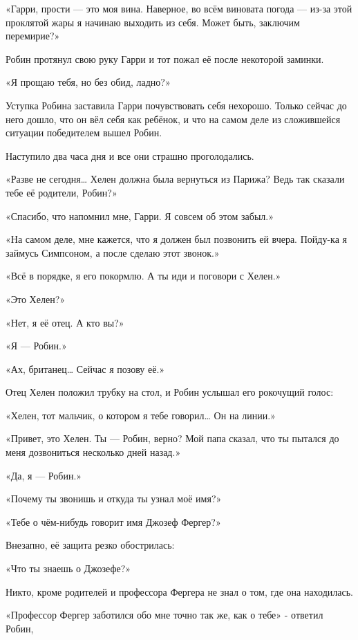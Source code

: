 \documentclass[a4paper,12pt]{book}
\begin{document}
\par
«Гарри, прости — это моя вина. Наверное, во всём виновата погода — из-за этой проклятой жары я начинаю выходить из себя. Может быть, заключим перемирие?»
\par
Робин протянул свою руку Гарри и тот пожал её после некоторой заминки.
\par
«Я прощаю тебя, но без обид, ладно?»
\par
Уступка Робина заставила Гарри почувствовать себя нехорошо. Только сейчас до него дошло, что он вёл себя как ребёнок, и что на самом деле из сложившейся ситуации победителем вышел Робин.
\par
Наступило два часа дня и все они страшно проголодались.
\par
«Разве не сегодня… Хелен должна была вернуться из Парижа? Ведь так сказали тебе её родители, Робин?»
\par
«Спасибо, что напомнил мне, Гарри. Я совсем об этом забыл.»
\par
«На самом деле, мне кажется, что я должен был позвонить ей вчера. Пойду-ка я займусь Симпсоном, а после сделаю этот звонок.»
\par
«Всё в порядке, я его покормлю. А ты иди и поговори с Хелен.»\\
\par
«Это Хелен?»
\par
«Нет, я её отец. А кто вы?»
\par
«Я — Робин.»
\par
«Ах, британец… Сейчас я позову её.»
\par
Отец Хелен положил трубку на стол, и Робин услышал его рокочущий голос:
\par
«Хелен, тот мальчик, о котором я тебе говорил… Он на линии.»\\
\par
«Привет, это Хелен. Ты — Робин, верно? Мой папа сказал, что ты пытался до меня дозвониться несколько дней назад.»
\par
«Да, я — Робин.»
\par
«Почему ты звонишь и откуда ты узнал моё имя?»
\par
«Тебе о чём-нибудь говорит имя Джозеф Фергер?»
\par
Внезапно, её защита резко обострилась:
\par
«Что ты знаешь о Джозефе?»
\par
Никто, кроме родителей и профессора Фергера не знал о том, где она находилась.
\par
«Профессор Фергер заботился обо мне точно так же, как о тебе» - ответил Робин,
\end{document}
